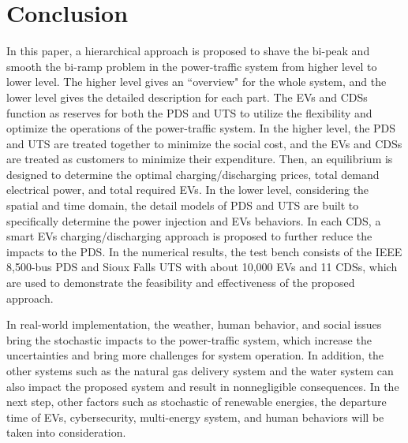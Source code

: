 \documentclass[final]{IEEEtran}
\begin{document}
\section{Conclusion}\label{Sec:Concl}
In this paper, a hierarchical approach is proposed to shave the bi-peak and smooth the bi-ramp problem in the power-traffic system from higher level to lower level. The higher level gives an ``overview" for the whole system, and the lower level gives the detailed description for each part. The EVs and CDSs function as reserves for both the PDS and UTS to utilize the flexibility and optimize the operations of the power-traffic system.  In the higher level, the PDS and UTS are treated together to minimize the social cost, and the EVs and CDSs are treated as customers to minimize their expenditure. Then, an equilibrium is designed to determine the optimal charging/discharging prices, total demand electrical power, and total required EVs. In the lower level, considering the spatial and time domain, the detail models of PDS and UTS are built to specifically determine the power injection and EVs behaviors. In each CDS, a smart EVs charging/discharging approach is proposed to further reduce the impacts to the PDS. In the numerical results, the test bench consists of the IEEE 8,500-bus PDS and Sioux Falls UTS with about 10,000 EVs and 11 CDSs, which are used to demonstrate the feasibility and effectiveness of the proposed approach.

In real-world implementation, the weather, human behavior, and social issues bring the stochastic impacts to the power-traffic system, which increase the uncertainties and bring more challenges for system operation. In addition, the other systems such as the natural gas delivery system and the water system can also impact the proposed system and result in nonnegligible consequences. In the next step, other factors such as stochastic of renewable energies, the departure time of EVs, cybersecurity, multi-energy system, and human behaviors will be taken into consideration.





\end{document}
